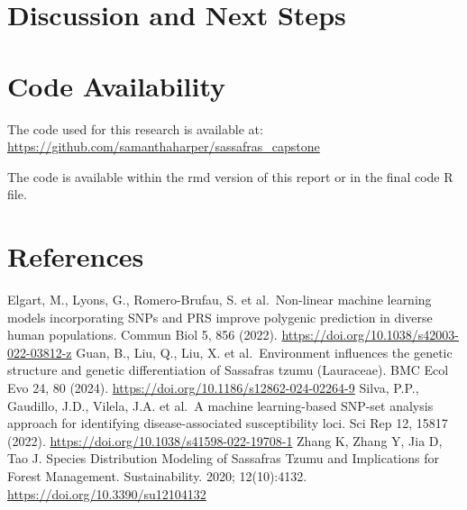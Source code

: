 \documentclass[
]{article}
\begin{document}
\section{Discussion and Next Steps}\label{discussion-and-next-steps}

\section{Code Availability}\label{code-availability}

The code used for this research is available at:
\url{https://github.com/samanthaharper/sassafras_capstone}

The code is available within the rmd version of this report or in the
final code R file.

\section{References}\label{references}

Elgart, M., Lyons, G., Romero-Brufau, S. et al.~Non-linear machine
learning models incorporating SNPs and PRS improve polygenic prediction
in diverse human populations. Commun Biol 5, 856 (2022).
\url{https://doi.org/10.1038/s42003-022-03812-z} Guan, B., Liu, Q., Liu,
X. et al.~Environment influences the genetic structure and genetic
differentiation of Sassafras tzumu (Lauraceae). BMC Ecol Evo 24, 80
(2024). \url{https://doi.org/10.1186/s12862-024-02264-9} Silva, P.P.,
Gaudillo, J.D., Vilela, J.A. et al.~A machine learning-based SNP-set
analysis approach for identifying disease-associated susceptibility
loci. Sci Rep 12, 15817 (2022).
\url{https://doi.org/10.1038/s41598-022-19708-1} Zhang K, Zhang Y, Jia
D, Tao J. Species Distribution Modeling of Sassafras Tzumu and
Implications for Forest Management. Sustainability. 2020; 12(10):4132.
\url{https://doi.org/10.3390/su12104132}
\end{document}
